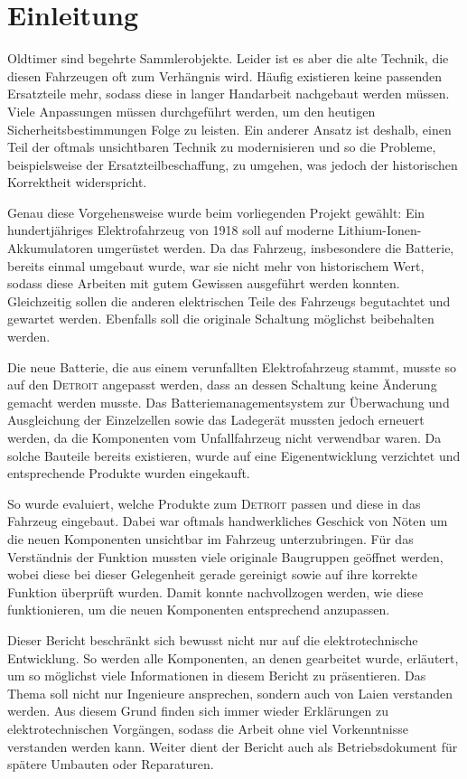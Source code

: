 \chapter{Einleitung}

\color{blue}
Oldtimer sind begehrte Sammlerobjekte. Leider ist es aber die alte Technik, die diesen Fahrzeugen oft zum Verhängnis wird. Häufig existieren keine passenden Ersatzteile mehr, sodass diese in langer Handarbeit nachgebaut werden müssen. Viele Anpassungen müssen durchgeführt werden, um den heutigen Sicherheitsbestimmungen Folge zu leisten. Ein anderer Ansatz ist deshalb, einen Teil der oftmals unsichtbaren Technik zu modernisieren und so die Probleme, beispielsweise der Ersatzteilbeschaffung, zu umgehen, was jedoch der historischen Korrektheit widerspricht.

Genau diese Vorgehensweise wurde beim vorliegenden Projekt gewählt: Ein hundertjähriges Elektrofahrzeug von 1918 soll auf moderne Lithium-Ionen-Akkumulatoren umgerüstet werden. Da das Fahrzeug, insbesondere die Batterie, bereits einmal umgebaut wurde, war sie nicht mehr von historischem Wert, sodass diese Arbeiten mit gutem Gewissen ausgeführt werden konnten. Gleichzeitig sollen die anderen elektrischen Teile des Fahrzeugs begutachtet und gewartet werden. Ebenfalls soll die originale Schaltung möglichst beibehalten werden.

Die neue Batterie, die aus einem verunfallten Elektrofahrzeug stammt, musste so auf den \linebreak\textsc{Detroit} angepasst werden, dass an dessen Schaltung keine Änderung gemacht werden musste. Das Batteriemanagementsystem zur Überwachung und Ausgleichung der Einzelzellen sowie das Ladegerät mussten jedoch erneuert werden, da die Komponenten vom Unfallfahrzeug nicht verwendbar waren. Da solche Bauteile bereits existieren, wurde auf eine Eigenentwicklung verzichtet und entsprechende Produkte wurden eingekauft.

So wurde evaluiert, welche Produkte zum \textsc{Detroit} passen und diese in das Fahrzeug eingebaut. Dabei war oftmals handwerkliches Geschick von Nöten um die neuen Komponenten unsichtbar im Fahrzeug unterzubringen. Für das Verständnis der Funktion mussten
viele originale Baugruppen geöffnet werden, wobei diese bei dieser Gelegenheit gerade gereinigt sowie auf ihre korrekte Funktion überprüft wurden. Damit konnte nachvollzogen werden, wie diese funktionieren, um die neuen Komponenten entsprechend anzupassen.

Dieser Bericht beschränkt sich bewusst nicht nur auf die elektrotechnische Entwicklung. So werden alle Komponenten, an denen gearbeitet wurde, erläutert, um so möglichst viele Informationen in diesem Bericht zu präsentieren. Das Thema soll nicht nur Ingenieure ansprechen, sondern auch von Laien verstanden werden. Aus diesem Grund finden sich immer wieder Erklärungen zu elektrotechnischen Vorgängen, sodass die Arbeit ohne viel Vorkenntnisse verstanden werden kann. Weiter dient der Bericht auch als Betriebsdokument für spätere Umbauten oder Reparaturen.
 \color{black}